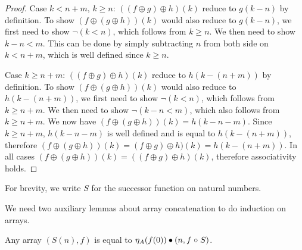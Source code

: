 \begin{toappendix}
\begin{proof}
        Case $k < n + m$, $k \geq n$: $((f \oplus g) \oplus h)(k)$ reduce to $g(k - n)$ by definition.
        To show $(f \oplus (g \oplus h))(k)$ would also reduce to $g(k - n)$, we first need to show $\neg(k < n)$,
        which follows from $k \geq n$. We then need to show $k - n < m$.
        This can be done by simply subtracting $n$ from both side on $k < n + m$, which is well defined since $k \geq n$.

        Case $k \geq n + m$: $((f \oplus g) \oplus h)(k)$ reduce to $h(k - (n + m))$ by definition.
        To show $(f \oplus (g \oplus h))(k)$ would also reduce to $h(k - (n + m))$,
        we first need to show $\neg(k < n)$, which follows from $k \geq n + m$.
        We then need to show $\neg(k - n < m)$, which also follows from $k \geq n + m$.
        We now have $(f \oplus (g \oplus h))(k) = h(k - n - m)$. Since $k \geq n + m$, $h(k - n - m)$ is well defined
        and is equal to $h(k - (n + m))$, therefore $(f \oplus (g \oplus h))(k) = (f \oplus g) \oplus h)(k) = h(k - (n + m))$.
        In all cases $(f \oplus (g \oplus h))(k) = ((f \oplus g) \oplus h)(k)$, therefore associativity holds.
    \end{proof}
    For brevity, we write $S$ for the successor function on natural numbers.
\end{toappendix}
%
We need two auxiliary lemmas about array concatenation to do induction on arrays.
%
\begin{lemmarep}
    \label{array:eta-suc}
    Any array $(S(n), f)$ is equal to $\eta_A (f(0)) \mathbin{\bullet} (n, f \mathrel{\circ} S)$.
\end{lemmarep}

